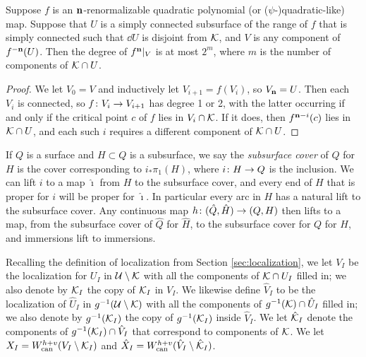 \begin{lemma} \label{lem:pullback-degree}
Suppose $f$ is an $\mathbf{n}$-renormalizable quadratic polynomial (or ($\psi$-)quadratic-like) map. Suppose that $U$ is a simply connected subsurface of the range of $f$ that is simply connected such that $\dd U$ is disjoint from $\mathcal K$, and $V$ is any component of $f^{-\mathbf{n}}(U)$. Then the degree of $f^{\mathbf{n}}|_V$ is at most $2^m$, where $m$ is the number of components of $\mathcal K \cap U$.
\end{lemma}
\begin{proof}
We let $V_0 = V$ and inductively let $V_{i+1} = f(V_i)$, so $V_{\mathbf{n}} = U$. 
Then each $V_i$ is connected, so $f\colon V_i \to V_{i+1}$ has degree 1 or 2, with the latter occurring if and only if the critical point $c$ of $f$ lies in $V_i \cap \mathcal K$. 
If it does,
then $f^{\mathbf{n} - i}(c)$ lies in $\mathcal K \cap U$,
and each such $i$
requires a different component of $\mathcal K \cap U$. 
\end{proof}



If $Q$ is a surface and $H \subset Q$ is a subsurface, 
we say the \emph{subsurface cover} of $Q$ for $H$ is the cover corresponding to $i_*\pi_1(H)$, 
where $i\colon H \to Q$ is the inclusion. 
We can lift $i$ to a map $\hat \imath$ from $H$ to the subsurface cover,
and every end of $H$ that is proper for $i$ will be proper for $\hat \imath$. 
In particular every arc in $H$ has a natural lift to the subsurface cover.
Any continuous map $h\colon (\hat Q, \hat H) \to (Q, H)$ then lifts to a map,
from the subsurface cover of $\hat Q$ for $\hat H$,
to the subsurface cover for $Q$ for $H$,
and immersions lift to immersions.

Recalling the definition of localization from Section \ref{sec:localization}, we let $V_I$ be the localization for $U_I$ in $\mathcal U\setminus \mathcal K$ with all the components of $\mathcal K\cap U_I$ filled in; we also denote by $\mathcal K_I$ the copy of $\mathcal K_I$ in $V_I$. 
We likewise define $\hat V_I$ 
to be the localization of $\hat U_I$ in $g^{-1}(\mathcal U\setminus \mathcal K)$ with all the components of $g^{-1}(\mathcal K)\cap \hat U_I$ filled in; we also denote by $g^{-1}(\mathcal K_I)$ the copy of $g^{-1}(\mathcal K_I)$ inside $\hat V_I$. We let $\hat{\mathcal K}_I$ denote the components of $g^{-1}(\mathcal K_I) \cap \hat V_I$ 
that correspond to components of $\mathcal K$.
We let $X_I = W_{\operatorname{can}}^{h+v}(V_I \setminus \mathcal K_I)$ and $\hat X_I = W_{\operatorname{can}}^{h+v}(\hat V_I \setminus \hat{\mathcal K}_I)$.

